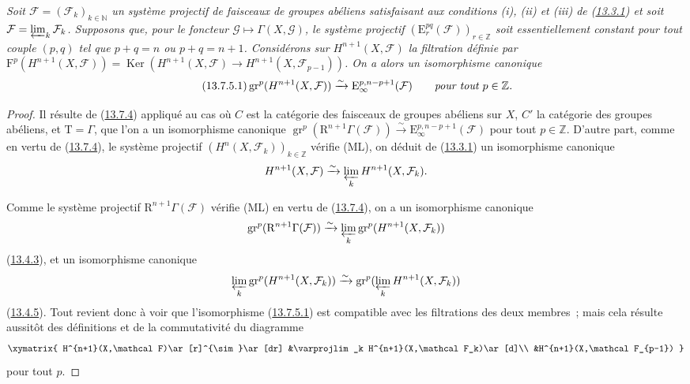 \begin{corollary}[13.7.5]
\label{0.13.7.5-fr}
\emph{Soit $\mathcal F=(\mathcal F_k)_{k\in\mathbb N}$ un système
projectif de faisceaux de groupes abéliens satisfaisant aux conditions
\emph{(i)}, \emph{(ii)} et \emph{(iii)} de
(\hyperref[0.13.3.1-fr]{13.3.1}) et soit
$\mathcal F=\varprojlim_k\mathcal F_k$. Supposons que, pour le foncteur
$\mathcal G\mapsto\Gamma(X,\mathcal G)$, le système projectif
$(\mathrm E_r^{pq}(\mathcal F))_{r\in\mathbb Z}$ soit essentiellement
constant pour tout couple $(p,q)$ tel que $p+q=n$ ou $p+q=n+1$.
Considérons sur $H^{n+1}(X,\mathcal F)$ la filtration définie par
$\mathrm F^p(H^{n+1}(X,\mathcal F))=
\operatorname{Ker}(H^{n+1}(X,\mathcal F)\to
H^{n+1}(X,\mathcal F_{p-1}))$. On a alors un isomorphisme canonique}
\begin{equation}
\label{0.13.7.5.1-fr}
\tag{13.7.5.1}
\operatorname{gr}^p(H^{n+1}(X,\mathcal F))
\xrightarrow{\sim}\mathrm E_\infty^{p,n-p+1}(\mathcal F)
\qquad\emph{pour tout $p\in\mathbb Z$.}
\end{equation}
\end{corollary}
\begin{proof}
Il résulte de (\hyperref[0.13.7.4-fr]{13.7.4}) appliqué au cas où $C$
est la catégorie des faisceaux de groupes abéliens sur $X$, $C'$ la
catégorie des groupes abéliens, et $\mathrm T=\Gamma$, que l'on a un
isomorphisme canonique
$\operatorname{gr}^p(\mathrm R^{n+1}\Gamma(\mathcal F))
\xrightarrow{\sim}\mathrm E_\infty^{p,n-p+1}(\mathcal F)$ pour tout
$p\in\mathbb Z$. D'autre part, comme en vertu de
(\hyperref[0.13.7.4-fr]{13.7.4}), le système projectif
$(H^n(X,\mathcal F_k))_{k\in\mathbb Z}$ vérifie (ML), on déduit de
(\hyperref[0.13.3.1-fr]{13.3.1}) un isomorphisme canonique
\hypertarget{canon-legacy.0-III.13.7.5.proof-comparison}{}
\[
\label{0.13.7.5.1b-fr}
H^{n+1}(X,\mathcal F)\xrightarrow{\sim}
\varprojlim_k H^{n+1}(X,\mathcal F_k).
\]

Comme le système projectif $\mathrm R^{n+1}\Gamma(\mathcal F)$ vérifie
(ML) en vertu de (\hyperref[0.13.7.4-fr]{13.7.4}), on a un isomorphisme
canonique
\[
\operatorname{gr}^p(\mathrm R^{n+1}\Gamma(\mathcal F))
\xrightarrow{\sim}
\varprojlim_k\operatorname{gr}^p(H^{n+1}(X,\mathcal F_k))
\]
(\hyperref[0.13.4.3-fr]{13.4.3}), et un isomorphisme canonique
\[
\varprojlim_k\operatorname{gr}^p(H^{n+1}(X,\mathcal F_k))
\xrightarrow{\sim}
\operatorname{gr}^p(\varprojlim_k H^{n+1}(X,\mathcal F_k))
\]
(\hyperref[0.13.4.5-fr]{13.4.5}). Tout revient donc à voir que
l'isomorphisme (\hyperref[0.13.7.5.1-fr]{13.7.5.1}) est compatible avec
les filtrations des deux membres~; mais cela résulte aussitôt des
définitions et de la commutativité du diagramme
\[
\xymatrix{
H^{n+1}(X,\mathcal F)\ar[r]^{\sim}\ar[dr]
&\varprojlim_k H^{n+1}(X,\mathcal F_k)\ar[d]\\
&H^{n+1}(X,\mathcal F_{p-1})
}
\]
pour tout $p$.
\end{proof}

